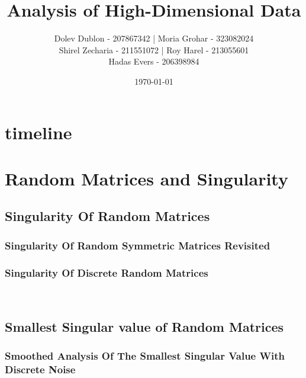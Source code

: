 \documentclass[12pt]{article}
\title{\textbf{Analysis of High-Dimensional Data}}
\author{
    Dolev Dublon - 207867342 |
    Moria Grohar - 323082024 \\
    Shirel Zecharia - 211551072 | 
    Roy Harel - 213055601 \\
    Hadas Evers - 206398984  
}
\date{\today}
\begin{document}
\maketitle


\tableofcontents

\newpage





\section{timeline}



\section{Random Matrices and Singularity}





\subsection{Singularity Of Random Matrices}

\subsubsection{Singularity Of Random Symmetric Matrices Revisited}



\subsubsection{Singularity Of Discrete Random Matrices}

\\\newline


\subsection{Smallest Singular value of Random Matrices}



\subsubsection{Smoothed Analysis Of The Smallest Singular Value With Discrete Noise}
\end{document}
